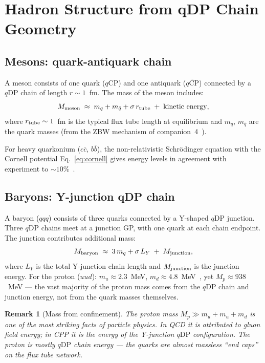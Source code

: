 \documentclass[12pt]{article}
\newtheorem{remark}[theorem]{Remark}
\newcommand{\qCP}{q\mathrm{CP}}
\newcommand{\qDP}{q\mathrm{DP}}
\begin{document}
\section{Hadron Structure from qDP Chain Geometry}
\label{sec:hadrons}

\subsection{Mesons: quark-antiquark chain}

A meson consists of one quark ($\qCP$) and one antiquark
($\overline{\qCP}$) connected by a $\qDP$ chain of length
$r \sim 1$~fm. The mass of the meson includes:
\begin{equation}
M_{\rm meson} \;\approx\; m_q + m_{\bar q} + \sigma\,r_{\rm tube}
\;+\; \text{kinetic energy},
\label{eq:meson_mass}
\end{equation}
where $r_{\rm tube} \sim 1$~fm is the typical flux tube length at
equilibrium and $m_q$, $m_{\bar q}$ are the quark masses (from the
ZBW mechanism of companion~4~\cite{c4}).

For heavy quarkonium ($c\bar c$, $b\bar b$), the non-relativistic
Schr\"odinger equation with the Cornell potential
Eq.~\eqref{eq:cornell} gives energy levels in agreement with
experiment to $\sim 10\%$~\cite{eichten1980}.

\subsection{Baryons: Y-junction qDP chain}

A baryon ($qqq$) consists of three quarks connected by a
Y-shaped $\qDP$ junction. Three $\qDP$ chains meet at a junction
GP, with one quark at each chain endpoint. The junction contributes
additional mass:
\begin{equation}
M_{\rm baryon} \;\approx\; 3\,m_q + \sigma\,L_Y
\;+\; M_{\rm junction},
\label{eq:baryon_mass}
\end{equation}
where $L_Y$ is the total Y-junction chain length and $M_{\rm junction}$
is the junction energy. For the proton ($uud$): $m_u \approx 2.3$~MeV,
$m_d \approx 4.8$~MeV~\cite{pdg2022}, yet $M_p \approx 938$~MeV — the
vast majority of the proton mass comes from the $\qDP$ chain and
junction energy, not from the quark masses themselves.

\begin{remark}[Mass from confinement]
The proton mass $M_p \gg m_u + m_u + m_d$ is one of the most striking
facts of particle physics. In QCD it is attributed to gluon field
energy; in CPP it is the energy of the Y-junction $\qDP$ configuration.
The proton is mostly $\qDP$ chain energy — the quarks are almost
massless ``end caps'' on the flux tube network.
\end{remark}
\end{document}
